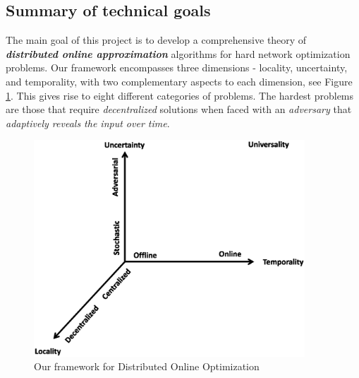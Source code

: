 \subsection{Summary of technical goals}
\label{sec:goals}

The main goal of this project is to develop a comprehensive theory of
{\bf \em distributed online approximation}\/ algorithms for hard
network optimization problems.  Our
framework encompasses three dimensions - locality, uncertainty, and
temporality, with two complementary aspects to each dimension, see
Figure \ref{fig:dimensions}.  This gives rise to eight different
categories of problems.  The hardest problems are those that require
{\em decentralized}\/ solutions when faced with an {\em adversary}\/
that {\em adaptively reveals the input over time}. 

\begin{figure}
\centering
\includegraphics[width=4in]{dimensions-rev.ps}
\caption{Our framework for Distributed Online Optimization}
\label{fig:dimensions}
\end{figure}

